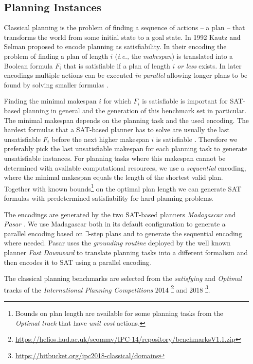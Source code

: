 \documentclass{elsarticle}
\begin{document}
\subsection{Planning Instances}
Classical planning is the problem of finding a sequence of actions -- a plan --
that transforms the world from some initial state to a goal state. In 1992 Kautz
and Selman \cite{Kautz1992} proposed to encode planning as satisfiability. In
their encoding the problem of finding a plan of length $i$ (\textit{i.e.,} the
\emph{makespan}) is translated into a Boolean formula $F_i$ that is satisfiable
if a plan of length $i$ \emph{or less} exists. In later encodings multiple
actions can be executed \emph{in parallel} allowing longer plans to be found by
solving smaller formulas \cite{Rintanen2006, Rintanen2007, Balyo2013}.

Finding the minimal makespan $i$ for which $F_i$ is satisfiable is important for
SAT-based planning in general and the generation of this benchmark set in
particular. The minimal makespan depends on the planning task and the used
encoding. The hardest formulas that a SAT-based planner has to solve are usually
the last unsatisfiable $F_i$ before the next higher makespan $i$ is satisfiable
\cite{Rintanen2006}. Therefore we preferably pick the last unsatisfiable
makespan for each planning task to generate unsatisfiable instances. For
planning tasks where this makespan cannot be determined with available
computational resources, we use a \emph{sequential} encoding, where the minimal
makespan equals the length of the shortest valid plan. Together with known
bounds\footnote{Bounds on plan length are available for some planning tasks from
  the \emph{Optimal track} that have \emph{unit cost} actions.} on the optimal
plan length we can generate SAT formulas with predetermined satisfiability for
hard planning problems.

The encodings are generated by the two SAT-based planners \emph{Madagascar}
\cite{Madagascar14} and \emph{Pasar} \cite{Pasar19}. We use Madagascar both in
its default configuration to generate a parallel encoding based on
$\exists$-step plans and to generate the sequential encoding where needed. Pasar
uses the \emph{grounding routine} deployed by the well known planner \emph{Fast
  Downward} \cite{FastDownward06} to translate planning tasks into a different
formalism and then encodes it to SAT using a parallel encoding.

The classical planning benchmarks are selected from the \emph{satisfying} and
\emph{Optimal} tracks of the \emph{International Planning Competitions} 2014
\footnote{\url{https://helios.hud.ac.uk/scommv/IPC-14/repository/benchmarksV1.1.zip}}
and 2018 \footnote{\url{https://bitbucket.org/ipc2018-classical/domains}}.
\end{document}
